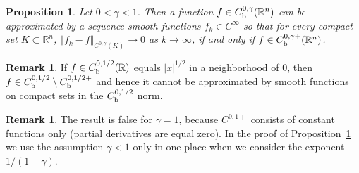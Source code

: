 \documentclass[intlimits,12pt,reqno]{amsart}
\newcommand{\bbbr}{\mathbb R}
\numberwithin{equation}{section}
\newtheorem{proposition}[theorem]{Proposition}
\theoremstyle{definition}
\newtheorem{remark}[theorem]{Remark}
\begin{document}
\begin{proposition}
\label{T4}
Let $0<\gamma<1$. Then a function  $f\in C_{\rm b}^{0,\gamma}(\bbbr^n)$ 
can be approximated by a sequence smooth functions $f_k\in C^\infty$ 
so that for every compact set $K\subset\bbbr^n$, $\Vert f_k-f\Vert_{C^{0,\gamma}(K)}\to 0$ as $k\to\infty$, if and only if
$f\in C_{\rm b}^{0,\gamma+}(\bbbr^n)$.
\end{proposition}
\begin{remark}
If $f\in C_{\rm b}^{0,1/2}(\bbbr)$ equals
$|x|^{1/2}$ in a neighborhood of $0$, then $f\in C_{\rm b}^{0,1/2}\setminus C_{\rm b}^{0,1/2+}$ and hence it cannot be approximated by smooth functions on compact sets in the $C_{\rm b}^{0,1/2}$ norm.
\end{remark}
\begin{remark}
The result is false for $\gamma=1$, because $C^{0,1+}$ consists of constant functions only (partial derivatives are equal zero). In the proof of Proposition~\ref{T4} we use the assumption $\gamma<1$ only in one place when we consider the exponent $1/(1-\gamma)$. 
\end{remark}
\end{document}
